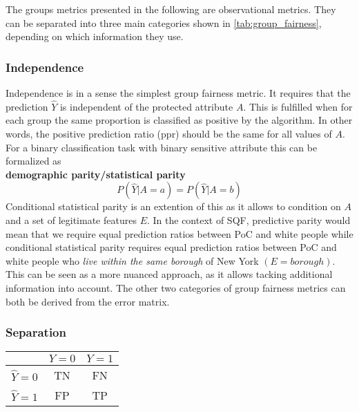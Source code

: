 The groups metrics presented in the following are observational metrics. They can be separated into three main categories shown in \autoref{tab:group_fairness}, depending on which information they use.

\subsubsection*{Independence}
Independence is in a sense the simplest group fairness metric. It requires that the prediction $\hat{Y}$ is independent of the protected attribute $A$. This is fulfilled when for each group the same proportion is classified as positive by the algorithm. In other words, the positive prediction ratio (ppr) should be the same for all values of $A$. For a binary classification task with binary sensitive attribute this can be formalized as \\
\textbf{demographic parity/statistical parity}
$$P(\hat{Y} | A = a) = P(\hat{Y} | A = b)$$
Conditional statistical parity is an extention of this as it allows to condition on $A$ and a set of legitimate features $E$. In the context of SQF, predictive parity would mean that we require equal prediction ratios between PoC and white people while conditional statistical parity requires equal prediction ratios between PoC and white people who \textit{live within the same borough} of New York $(E = borough)$. This can be seen as a more nuanced approach, as it allows tacking additional information into account.
The other two categories of group fairness metrics can both be derived from the error matrix.

\subsubsection*{Separation}

\begin{center}
    \renewcommand{\arraystretch}{1.5}  %
    \begin{tabular}{|c|c|c|}
        \hline
        & \textbf{\(Y = 0\)} & \textbf{\(Y = 1\)} \\
        \hline
        \(\hat{Y} = 0\) & TN & FN \\
        \hline
        \(\hat{Y} = 1\) & FP & TP \\
        \hline
    \end{tabular}
    \label{tab:confusion_matrix_1}
\end{center}

